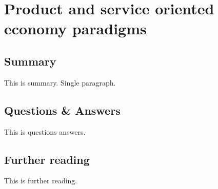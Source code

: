 \section{Product and service oriented economy paradigms}

\subsection{Summary}
This is summary. Single paragraph.

\subsection{Questions \& Answers}
This is questions answers.

\subsection{Further reading}
This is further reading.

